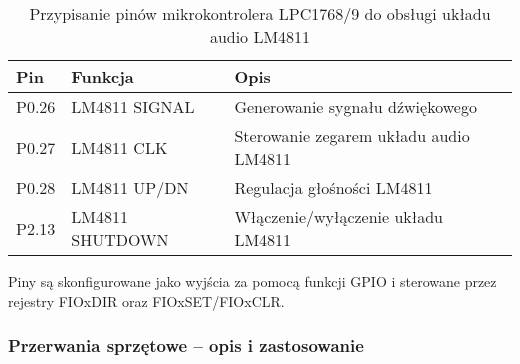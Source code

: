 \begin{table}[H]
\centering
\caption{Przypisanie pinów mikrokontrolera LPC1768/9 do obsługi układu audio LM4811}
\begin{tabular}{@{}lll@{}}
\toprule
\textbf{Pin} & \textbf{Funkcja}                  & \textbf{Opis} \\ \midrule
P0.26        & LM4811 SIGNAL                     & Generowanie sygnału dźwiękowego \\
P0.27        & LM4811 CLK                       & Sterowanie zegarem układu audio LM4811 \\
P0.28        & LM4811 UP/DN                     & Regulacja głośności LM4811 \\
P2.13        & LM4811 SHUTDOWN                  & Włączenie/wyłączenie układu LM4811 \\
\bottomrule
\end{tabular}
\end{table}

Piny są skonfigurowane jako wyjścia za pomocą funkcji GPIO i sterowane przez rejestry FIOxDIR oraz FIOxSET/FIOxCLR.


\subsubsection{Przerwania sprzętowe – opis i zastosowanie}

